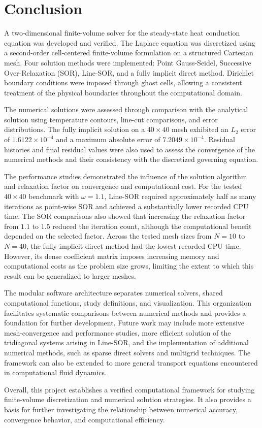 \section{Conclusion}

A two-dimensional finite-volume solver for the steady-state heat conduction equation was developed and verified. The Laplace equation was discretized using a second-order cell-centered finite-volume formulation on a structured Cartesian mesh. Four solution methods were implemented: Point Gauss-Seidel, Successive Over-Relaxation (SOR), Line-SOR, and a fully implicit direct method. Dirichlet boundary conditions were imposed through ghost cells, allowing a consistent treatment of the physical boundaries throughout the computational domain.

The numerical solutions were assessed through comparison with the analytical solution using temperature contours, line-cut comparisons, and error distributions. The fully implicit solution on a $40\times40$ mesh exhibited an $L_2$ error of $1.6122\times10^{-4}$ and a maximum absolute error of $7.2049\times10^{-4}$. Residual histories and final residual values were also used to assess the convergence of the numerical methods and their consistency with the discretized governing equation.

The performance studies demonstrated the influence of the solution algorithm and relaxation factor on convergence and computational cost. For the tested $40\times40$ benchmark with $\omega=1.1$, Line-SOR required approximately half as many iterations as point-wise SOR and achieved a substantially lower recorded CPU time. The SOR comparisons also showed that increasing the relaxation factor from $1.1$ to $1.5$ reduced the iteration count, although the computational benefit depended on the selected factor. Across the tested mesh sizes from $N=10$ to $N=40$, the fully implicit direct method had the lowest recorded CPU time. However, its dense coefficient matrix imposes increasing memory and computational costs as the problem size grows, limiting the extent to which this result can be generalized to larger meshes.

The modular software architecture separates numerical solvers, shared computational functions, study definitions, and visualization. This organization facilitates systematic comparisons between numerical methods and provides a foundation for further development. Future work may include more extensive mesh-convergence and performance studies, more efficient solution of the tridiagonal systems arising in Line-SOR, and the implementation of additional numerical methods, such as sparse direct solvers and multigrid techniques. The framework can also be extended to more general transport equations encountered in computational fluid dynamics.

Overall, this project establishes a verified computational framework for studying finite-volume discretization and numerical solution strategies. It also provides a basis for further investigating the relationship between numerical accuracy, convergence behavior, and computational efficiency.